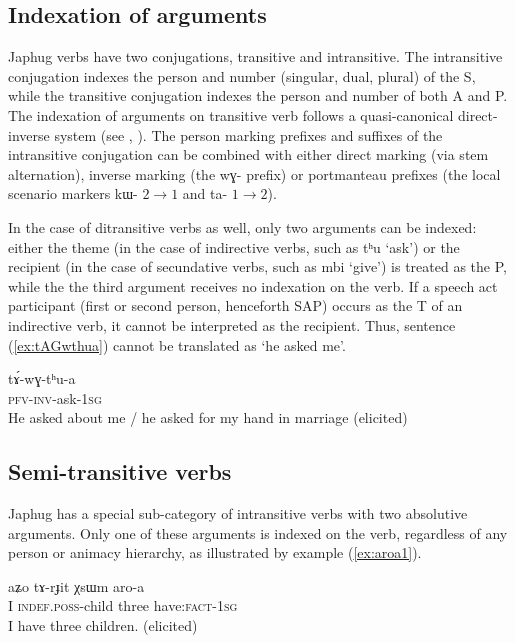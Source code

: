 \documentclass[oldfontcommands,oneside,a4paper,11pt]{article}
\newcommand{\ipa}[1]{{\phon #1}} %
\newcommand{\refb}[1]{(\ref{#1})}
\begin{document}
\subsection{Indexation of arguments}

Japhug verbs have two conjugations, transitive and intransitive. The intransitive conjugation indexes the person and number (singular, dual, plural) of the S, while the transitive conjugation indexes the person and number of both A and P. The indexation of arguments on transitive verb follows a quasi-canonical direct-inverse system (see \citealt{jacques10inverse}, \citealt{jacques14inverse}). The person marking prefixes and suffixes of the intransitive conjugation can be combined with either direct marking (via stem alternation), inverse marking (the \ipa{wɣ-} prefix) or portmanteau prefixes (the local scenario markers \ipa{kɯ-} $2\rightarrow1$ and \ipa{ta-} $1\rightarrow2$).


In the case of ditransitive verbs as well, only two arguments can be indexed: either the theme (in the case of indirective verbs, such as \ipa{tʰu} `ask') or the recipient (in the case of secundative verbs, such as \ipa{mbi} `give') is treated as the P, while the the third argument receives no indexation on the verb. If a  speech act participant (first or second person, henceforth SAP) occurs as the T of an indirective verb, it cannot be interpreted as the recipient. Thus, sentence \refb{ex:tAGwthua} cannot be translated as `he asked me'.

 \begin{exe}
   \ex   \label{ex:tAGwthua}
 \gll
\ipa{tɤ́-wɣ-tʰu-a} \\
\textsc{pfv-inv}-ask-\textsc{1sg}\\
\glt He asked about me / he asked for my hand in marriage (elicited)   
      \end{exe}  
      

\subsection{Semi-transitive verbs}
  Japhug has a special sub-category of intransitive verbs with two absolutive arguments. Only one of these arguments is indexed on the verb, regardless of any person or animacy hierarchy, as illustrated by example \refb{ex:aroa1}.
  

 \begin{exe}
   \ex   \label{ex:aroa1}
 \gll 
\ipa{aʑo}  	\ipa{tɤ-rɟit}  	\ipa{χsɯm}  	\ipa{aro-a}   \\
I \textsc{indef.poss}-child three have:\textsc{fact}-\textsc{1sg} \\
 \glt   I have three children. (elicited)
   \end{exe} 
\end{document}
